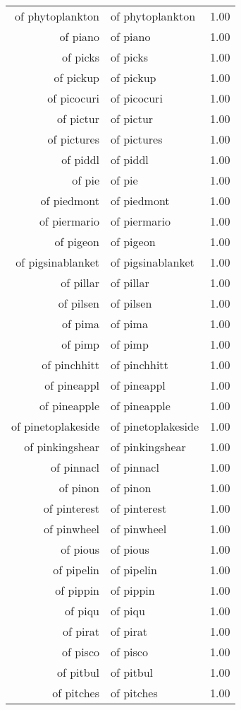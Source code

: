 \begin{table}[ht]
\begin{tabular}{rlr}
  of phytoplankton & of phytoplankton & 1.00 \\ 
  of piano & of piano & 1.00 \\ 
  of picks & of picks & 1.00 \\ 
  of pickup & of pickup & 1.00 \\ 
  of picocuri & of picocuri & 1.00 \\ 
  of pictur & of pictur & 1.00 \\ 
  of pictures & of pictures & 1.00 \\ 
  of piddl & of piddl & 1.00 \\ 
  of pie & of pie & 1.00 \\ 
  of piedmont & of piedmont & 1.00 \\ 
  of piermario & of piermario & 1.00 \\ 
  of pigeon & of pigeon & 1.00 \\ 
  of pigsinablanket & of pigsinablanket & 1.00 \\ 
  of pillar & of pillar & 1.00 \\ 
  of pilsen & of pilsen & 1.00 \\ 
  of pima & of pima & 1.00 \\ 
  of pimp & of pimp & 1.00 \\ 
  of pinchhitt & of pinchhitt & 1.00 \\ 
  of pineappl & of pineappl & 1.00 \\ 
  of pineapple & of pineapple & 1.00 \\ 
  of pinetoplakeside & of pinetoplakeside & 1.00 \\ 
  of pinkingshear & of pinkingshear & 1.00 \\ 
  of pinnacl & of pinnacl & 1.00 \\ 
  of pinon & of pinon & 1.00 \\ 
  of pinterest & of pinterest & 1.00 \\ 
  of pinwheel & of pinwheel & 1.00 \\ 
  of pious & of pious & 1.00 \\ 
  of pipelin & of pipelin & 1.00 \\ 
  of pippin & of pippin & 1.00 \\ 
  of piqu & of piqu & 1.00 \\ 
  of pirat & of pirat & 1.00 \\ 
  of pisco & of pisco & 1.00 \\ 
  of pitbul & of pitbul & 1.00 \\ 
  of pitches & of pitches & 1.00 \\ 

\end{tabular}
\end{table}
